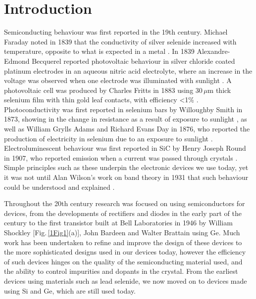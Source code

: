 
\chapter{Introduction}

\graphicspath{{Chapter1/Figures/}}

Semiconducting behaviour was first reported in the 19th century. Michael Faraday noted in 1839 that the conductivity of silver selenide increased with temperature, opposite to what is expected in a metal \cite{Faraday2012}. In 1839 Alexandre-Edmond Becquerel reported photovoltaic behaviour in silver chloride coated platinum electrodes in an aqueous nitric acid electrolyte, where an increase in the voltage was observed when one electrode was illuminated with sunlight \cite{Becquerel1839}. A photovoltaic cell was produced by Charles Fritts in 1883 using 30\,$\mu$m thick selenium film with thin gold leaf contacts, with efficiency <1\% \cite{Fritts1883}. Photoconductivity was first reported in selenium bars by Willoughby Smith in 1873, showing in the change in resistance as a result of exposure to sunlight \cite{Smith1873}, as well as William Grylls Adams and Richard Evans Day in 1876, who reported the production of electricity in selenium due to an exposure to sunlight \cite{Adams1876}. Electroluminescent behaviour was first reported in SiC by Henry Joseph Round in 1907, who reported emission when a current was passed through crystals \cite{Round1907}. Simple principles such as these underpin the electronic devices we use today, yet it was not until Alan Wilson's work on band theory in 1931 that such behaviour could be understood and explained \cite{Wilson1931}. 

Throughout the 20th century research was focused on using semiconductors for devices, from the developments of rectifiers and diodes in the early part of the century to the first transistor built at Bell Laboratories in 1946 by William Shockley [Fig.\,\ref{1Fig1}(a)], John Bardeen and Walter Brattain using Ge. Much work has been undertaken to refine and improve the design of these devices to the more sophisticated designs used in our devices today, however the efficiency of such devices hinges on the quality of the semiconducting material used, and the ability to control impurities and dopants in the crystal. From the earliest devices using materials such as lead selenide, we now moved on to devices made using Si and Ge, which are still used today.

